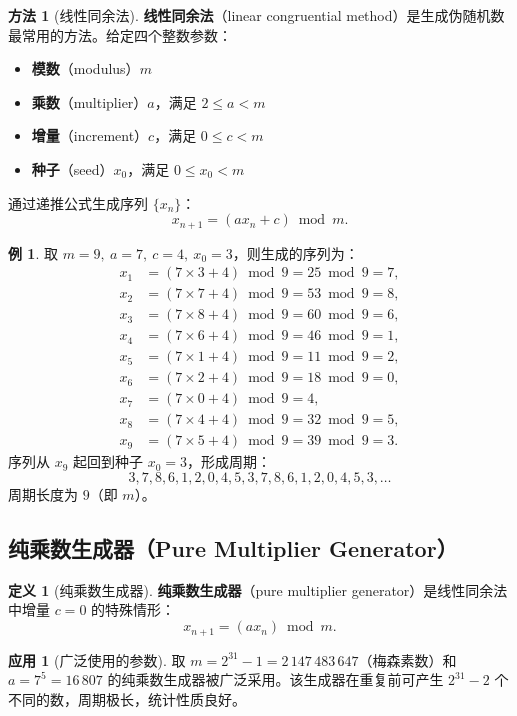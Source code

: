 \documentclass[UTF8,11pt,a4paper]{ctexbook}   %
\theoremstyle{definition}
\newtheorem{definition}{定义}[section]
\newtheorem{example}{例}[section]
\newtheorem{application}{应用}[section]
\newtheorem{method}{方法}[section]
\begin{document}
\begin{method}[线性同余法]
\textbf{线性同余法}（linear congruential method）是生成伪随机数最常用的方法。给定四个整数参数：
\begin{itemize}
    \item \textbf{模数}（modulus）$m$
    \item \textbf{乘数}（multiplier）$a$，满足 $2 \le a < m$
    \item \textbf{增量}（increment）$c$，满足 $0 \le c < m$
    \item \textbf{种子}（seed）$x_0$，满足 $0 \le x_0 < m$
\end{itemize}
通过递推公式生成序列 $\{x_n\}$：
\[
x_{n+1} = (a x_n + c) \bmod m.
\]
\end{method}

\begin{example}
取 $m=9,\ a=7,\ c=4,\ x_0=3$，则生成的序列为：
\begin{align*}
x_1 &= (7 \times 3 + 4) \bmod 9 = 25 \bmod 9 = 7,\\
x_2 &= (7 \times 7 + 4) \bmod 9 = 53 \bmod 9 = 8,\\
x_3 &= (7 \times 8 + 4) \bmod 9 = 60 \bmod 9 = 6,\\
x_4 &= (7 \times 6 + 4) \bmod 9 = 46 \bmod 9 = 1,\\
x_5 &= (7 \times 1 + 4) \bmod 9 = 11 \bmod 9 = 2,\\
x_6 &= (7 \times 2 + 4) \bmod 9 = 18 \bmod 9 = 0,\\
x_7 &= (7 \times 0 + 4) \bmod 9 = 4,\\
x_8 &= (7 \times 4 + 4) \bmod 9 = 32 \bmod 9 = 5,\\
x_9 &= (7 \times 5 + 4) \bmod 9 = 39 \bmod 9 = 3.
\end{align*}
序列从 $x_9$ 起回到种子 $x_0=3$，形成周期：
\[
3, 7, 8, 6, 1, 2, 0, 4, 5, 3, 7, 8, 6, 1, 2, 0, 4, 5, 3, \ldots
\]
周期长度为 $9$（即 $m$）。
\end{example}

\subsection{纯乘数生成器（Pure Multiplier Generator）}

\begin{definition}[纯乘数生成器]
\textbf{纯乘数生成器}（pure multiplier generator）是线性同余法中增量 $c=0$ 的特殊情形：
\[
x_{n+1} = (a x_n) \bmod m.
\]
\end{definition}

\begin{application}[广泛使用的参数]
取 $m = 2^{31}-1 = 2\,147\,483\,647$（梅森素数）和 $a = 7^5 = 16\,807$ 的纯乘数生成器被广泛采用。该生成器在重复前可产生 $2^{31}-2$ 个不同的数，周期极长，统计性质良好。
\end{application}
\end{document}

